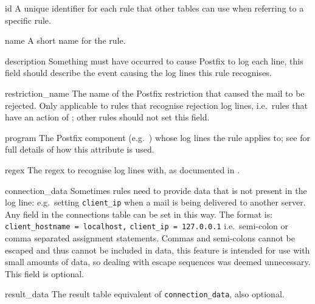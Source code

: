\begin{boldeqlist}

    \item [id] A unique identifier for each rule that other tables can use
        when referring to a specific rule.

    \item [name] A short name for the rule.

    \item [description] Something must have occurred to cause Postfix to
        log each line, this field should describe the event causing the log
        lines this rule recognises.

    \item [restriction\_name] The name of the Postfix restriction that
        caused the mail to be rejected.  Only applicable to rules that
        recognise rejection log lines, i.e.\ rules that have an action of
        ; other rules should not set this field.

    \item [program] The Postfix component (e.g.\ ) whose log
        lines the rule applies to; see  for full details of how this attribute is used.

    \item [regex] The regex to recognise log lines with, as documented in
        .

    \item [connection\_data] Sometimes rules need to provide data that is
        not present in the log line: e.g.\ setting \texttt{client\_ip} when
        a mail is being delivered to another server.  Any field in the
        connections table can be set in this way.  The format is:
        \newline{} \tab{} \texttt{ client\_hostname = localhost,}
        \newline{} \tab{} \tab{} \texttt{client\_ip = 127.0.0.1} \newline{}
        i.e.\ semi-colon or comma separated assignment statements.  Commas
        and semi-colons cannot be escaped and thus cannot be included in
        data, this feature is intended for use with small amounts of data,
        so dealing with escape sequences was deemed unnecessary.  This
        field is optional.

    \item [result\_data] The result table equivalent of
        \texttt{connection\_data}, also optional.


\end{boldeqlist}
